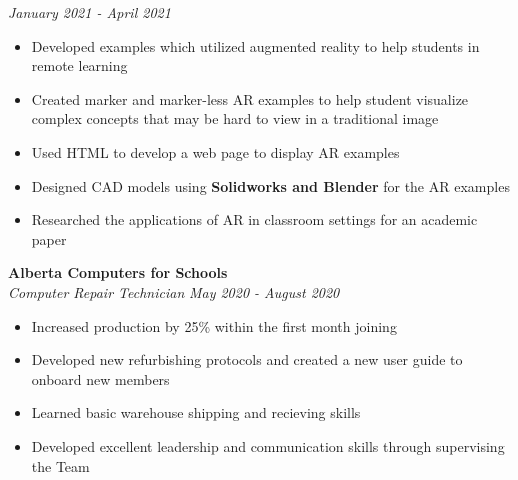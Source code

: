 \documentclass[a4paper,20pt]{article}
\begin{document}
        \textit{January 2021 - April 2021} \\
        \vspace{-18pt} 
        \hspace{-3pt}
        \begin{itemize}
            \item Developed examples which utilized augmented reality to help students in remote learning \vspace{-5pt}
            \item Created marker and marker-less AR examples to help student visualize complex concepts that may be hard to view in a traditional image \vspace{-5pt}
            \item Used HTML to develop a web page to display AR examples \vspace{-5pt}
            \item Designed CAD models using \textbf{Solidworks and Blender} for the AR examples  \vspace{-5pt}
            \item Researched the applications of AR in classroom settings for an academic paper
        \end{itemize}        

    \vspace{-1pt}
            \textbf{Alberta Computers for Schools}\hspace{3cm}
            \textit{}\\
            \textit{Computer Repair Technician}\hspace{9.9 cm}
            \textit{May 2020 - August 2020} \\
            \vspace{-18pt} 
            \hspace{-3pt}
            \begin{itemize}
                \item Increased production by 25\% within the first month joining \vspace{-5pt}
                \item Developed new refurbishing protocols and created a new user guide to onboard new members \vspace{-5pt}
                \item Learned basic warehouse shipping and recieving skills \vspace{-5pt}
                \item Developed excellent leadership and communication skills through supervising the Team 
            \end{itemize}    
\end{document}
